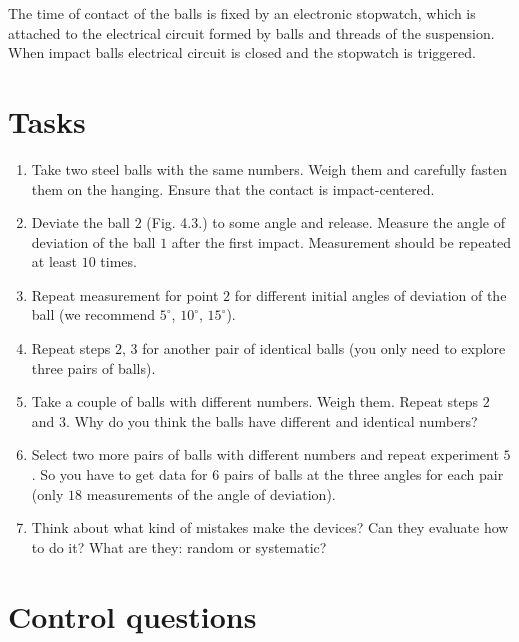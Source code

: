 \documentclass{LabWorkEng}
\begin{document}
The time of contact of the balls is fixed by an electronic stopwatch, which is attached to the electrical circuit formed by balls and threads of the suspension. When impact balls electrical circuit is closed and the stopwatch is triggered.

\section{Tasks}

\begin{enumerate}
	\item Take two steel balls with the same numbers. Weigh them and carefully fasten them on the hanging. Ensure that the contact is impact-centered.
	\item Deviate the ball $2$ (Fig. 4.3.) to some angle and release. Measure the angle of deviation of the ball $1$ after the first impact. Measurement should be repeated at least $10$ times.
	\item Repeat measurement for point $2$ for different initial angles of deviation of the ball (we recommend $5^\circ$, $10^\circ$, $15^\circ$).
	\item Repeat steps $2$, $3$ for another pair of identical balls (you only need to explore three pairs of balls).
	\item Take a couple of balls with different numbers. Weigh them. Repeat steps $2$ and $3$. Why do you think the balls have different and identical numbers?
	\item 	Select two more pairs of balls with different numbers and repeat experiment $5$. So you have to get data for $6$ pairs of balls at the three angles for each pair (only $18$ measurements of the angle of deviation).
	\item Think about what kind of mistakes make the devices? Can they evaluate how to do it? What are they: random or systematic?
\end{enumerate}

\section*{Control questions}
\end{document}
